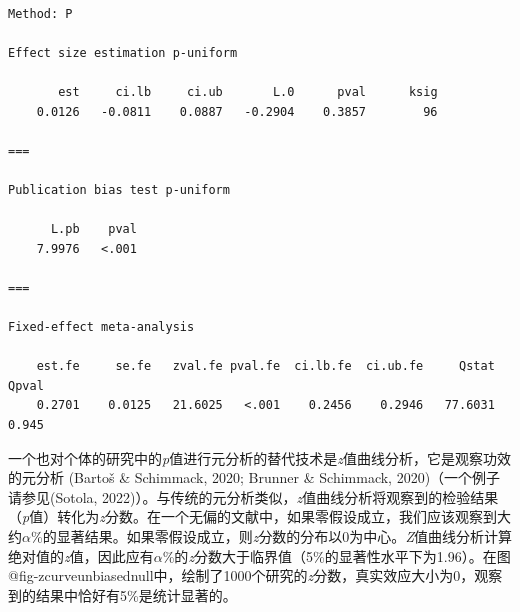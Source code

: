 \documentclass[
  letterpaper,
  DIV=11,
  numbers=noendperiod]{scrreprt}
\newenvironment{Shaded}{\begin{snugshade}}{\end{snugshade}}
\newcommand{\AttributeTok}[1]{\textcolor[rgb]{0.40,0.45,0.13}{#1}}
\newcommand{\FunctionTok}[1]{\textcolor[rgb]{0.28,0.35,0.67}{#1}}
\newcommand{\NormalTok}[1]{\textcolor[rgb]{0.00,0.23,0.31}{#1}}
\newcommand{\SpecialCharTok}[1]{\textcolor[rgb]{0.37,0.37,0.37}{#1}}
\newcommand{\StringTok}[1]{\textcolor[rgb]{0.13,0.47,0.30}{#1}}
\begin{document}
\begin{Shaded}
\end{Shaded}

\begin{verbatim}

Method: P

Effect size estimation p-uniform

       est     ci.lb     ci.ub       L.0      pval      ksig
    0.0126   -0.0811    0.0887   -0.2904    0.3857        96

===

Publication bias test p-uniform

      L.pb    pval
    7.9976   <.001

===

Fixed-effect meta-analysis

    est.fe     se.fe   zval.fe pval.fe  ci.lb.fe  ci.ub.fe     Qstat     Qpval
    0.2701    0.0125   21.6025   <.001    0.2456    0.2946   77.6031     0.945
\end{verbatim}

一个也对个体的研究中的\emph{p}值进行元分析的替代技术是\emph{z}值曲线分析，它是观察功效的元分析
(Bartoš \& Schimmack, 2020; Brunner \& Schimmack,
2020)（一个例子请参见(Sotola,
2022)）。与传统的元分析类似，\emph{z}值曲线分析将观察到的检验结果（\emph{p}值）转化为\emph{z}分数。在一个无偏的文献中，如果零假设成立，我们应该观察到大约\(\alpha\)\%的显著结果。如果零假设成立，则\emph{z}分数的分布以0为中心。\emph{Z}值曲线分析计算绝对值的\emph{z}值，因此应有\(\alpha\)\%的\emph{z}分数大于临界值（5\%的显著性水平下为1.96）。在图@fig-zcurveunbiasednull中，绘制了1000个研究的\emph{z}分数，真实效应大小为0，观察到的结果中恰好有5\%是统计显著的。
\end{document}
